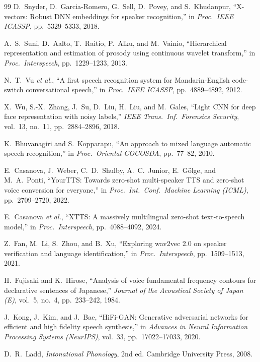 \documentclass[10pt,twocolumn]{article}
\begin{document}
\begin{thebibliography}{99}
D.~Snyder, D.~Garcia-Romero, G.~Sell, D.~Povey, and S.~Khudanpur,
``X-vectors: Robust DNN embeddings for speaker recognition,''
in \emph{Proc.\ IEEE ICASSP}, pp.~5329--5333, 2018.

A.~S.~Suni, D.~Aalto, T.~Raitio, P.~Alku, and M.~Vainio,
``Hierarchical representation and estimation of prosody using continuous wavelet transform,''
in \emph{Proc.\ Interspeech}, pp.~1229--1233, 2013.

N.~T.~Vu \emph{et al.},
``A first speech recognition system for Mandarin-English code-switch conversational speech,''
in \emph{Proc.\ IEEE ICASSP}, pp.~4889--4892, 2012.

X.~Wu, S.-X.~Zhang, J.~Su, D.~Liu, H.~Liu, and M.~Gales,
``Light CNN for deep face representation with noisy labels,''
\emph{IEEE Trans.\ Inf.\ Forensics Security}, vol.~13, no.~11, pp.~2884--2896, 2018.

K.~Bhuvanagiri and S.~Kopparapu,
``An approach to mixed language automatic speech recognition,''
in \emph{Proc.\ Oriental COCOSDA}, pp.~77--82, 2010.

E.~Casanova, J.~Weber, C.~D.~Shulby, A.~C.~Junior, E.~G{\"o}lge, and M.~A.~Ponti,
``YourTTS: Towards zero-shot multi-speaker TTS and zero-shot voice conversion for everyone,''
in \emph{Proc.\ Int.\ Conf.\ Machine Learning (ICML)}, pp.~2709--2720, 2022.

E.~Casanova \emph{et al.},
``XTTS: A massively multilingual zero-shot text-to-speech model,''
in \emph{Proc.\ Interspeech}, pp.~4088--4092, 2024.

Z.~Fan, M.~Li, S.~Zhou, and B.~Xu,
``Exploring wav2vec 2.0 on speaker verification and language identification,''
in \emph{Proc.\ Interspeech}, pp.~1509--1513, 2021.

H.~Fujisaki and K.~Hirose,
``Analysis of voice fundamental frequency contours for declarative sentences of Japanese,''
\emph{Journal of the Acoustical Society of Japan (E)}, vol.~5, no.~4, pp.~233--242, 1984.

J.~Kong, J.~Kim, and J.~Bae,
``HiFi-GAN: Generative adversarial networks for efficient and high fidelity speech synthesis,''
in \emph{Advances in Neural Information Processing Systems (NeurIPS)}, vol.~33, pp.~17022--17033, 2020.

D.~R.~Ladd,
\emph{Intonational Phonology}, 2nd ed.
Cambridge University Press, 2008.


\end{thebibliography}
\end{document}
